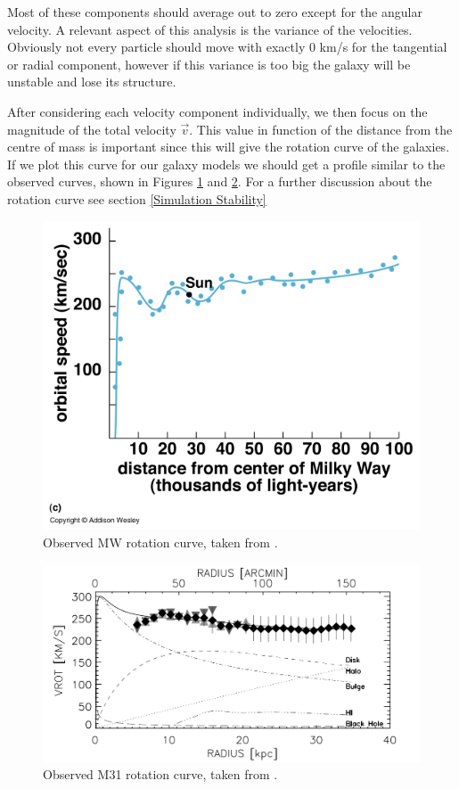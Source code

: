 \documentclass[a4paper,12pt, english]{article}
\begin{document}
\smallskip
Most of these components should average out to zero except for the angular velocity. A relevant aspect of this analysis is the variance of the velocities. Obviously not every particle should move with exactly 0 km/s for the tangential or radial component, however if this variance is too big the galaxy will be unstable and lose its structure.\par
\smallskip
After considering each velocity component individually, we then focus on the magnitude of the total velocity $\vec{v}$. This value in function of the distance from the centre of mass is important since this will give the rotation curve of the galaxies. If we plot this curve for our galaxy models we should get a profile similar to the observed curves, shown in Figures \ref{fig:obs-mw-curve} and \ref{fig:obs-m31-curve}. For a further discussion about the rotation curve see section \ref{Simulation Stability}\par
\begin{figure}[!h]
    \centering
    \includegraphics[width=0.55\linewidth]{Rotation_Curve.jpg}
    \caption{Observed MW rotation curve, taken from \textcite{Obennet_2017}.}
    \label{fig:obs-mw-curve}
\end{figure}

\begin{figure}[!h]
    \centering
    \includegraphics[width=0.7\linewidth]{observed_m31_rot_curve.png}
    \caption{Observed M31 rotation curve, taken from \textcite{Carignan_2006}.}
    \label{fig:obs-m31-curve}
\end{figure}
\end{document}
